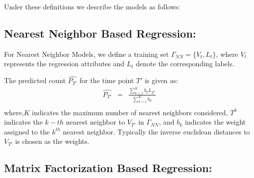 Under these definitions we describe the models as follows:

\subsection{\label{sec:model:nearestneighbor} Nearest Neighbor Based
Regression:}
For Nearest Neighbor Models, we define a training set $\Gamma_{NN}
= \lbrace V_t, L_t \rbrace$, where $V_t$ represents the regression attributes
and $L_t$ denote the corresponding labels. 

The predicted count $\widehat{P_{T'}}$ for the time point $T'$ is given as:
\begin{equation} \label{eq:nearestneighbor:pred}
  \begin{array}{lcl}
    \widehat{P_{T'}} & = & \frac{\sum\limits_{k=1}^{K} b_{k}L_{T^k}}{\sum\limits_{k=1}^{K} b_{k}}\\
  \end{array}
\end{equation}
where,$K$ indicates the maximum number of nearest neighbors considered, $T^k$
indicates the $k-th$ nearest neighbor to $V_{T'}$ in $\Gamma_{NN}$, and $b_k$
indicates the weight assigned to the $k^{th}$ nearest neighbor. Typically the 
inverse euclidean distances to $V_{T'}$ is chosen as the weights.

\subsection{\label{sec:model:matrixfactor} Matrix Factorization Based
Regression:}

